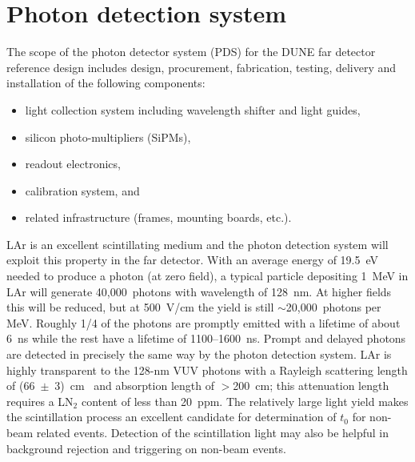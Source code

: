 
\section{Photon detection system}
\label{sec:pd_system}


The scope of the photon detector system (PDS) for the DUNE far detector
reference design includes design, procurement, fabrication,
testing, delivery and installation of the following components:
\begin{itemize}
\item light collection system including wavelength shifter and light guides,
\item silicon photo-multipliers (SiPMs),
\item readout electronics,
\item calibration system, and
\item related infrastructure (frames, mounting boards, etc.).
\end{itemize}


LAr is an excellent scintillating medium and the photon detection
system will exploit this property in the far detector.  With an
average energy of 19.5~eV needed to produce a photon (at zero field),
a typical particle depositing 1~MeV in LAr will generate
40,000~photons with wavelength of 128~nm. At higher fields this will
be reduced, but at 500~V/cm the yield is still $\sim$20,000~photons
per MeV. Roughly 1/4 of the photons are promptly emitted with a
lifetime of about 6~ns while the rest have a lifetime of
1100--1600~ns. Prompt and delayed photons are detected in
  precisely the same way by the photon detection system. LAr is
highly transparent to the 128-nm VUV photons with a Rayleigh
scattering length of (66~$\pm$~3)~cm~\cite{Rayleigh} and absorption
length of $>$200~cm; this attenuation length requires a LN$_2$
  content of less than 20~ppm. The relatively large light yield makes
the scintillation process an excellent candidate for determination of
$t_0$ for non-beam related events. Detection of the scintillation
light may also be helpful in background rejection and triggering on
non-beam events.

